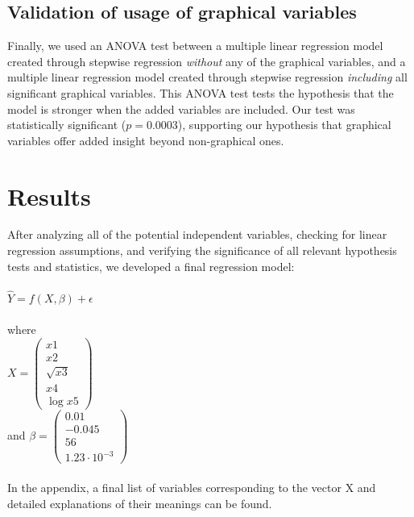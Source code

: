 \documentclass[oneside,12pt]{report}
\begin{document}
\section*{Validation of usage of graphical variables}

Finally, we used an ANOVA test between a multiple linear regression model created through stepwise regression \emph{without} any of the graphical variables, and a multiple linear regression model created through stepwise regression \emph{including} all significant graphical variables. This ANOVA test tests the hypothesis that the model is stronger when the added variables are included. Our test was statistically significant (\begin{math}p=0.0003\end{math}), supporting our hypothesis that graphical variables offer added insight beyond non-graphical ones.

\chapter{Results}

After analyzing all of the potential independent variables, checking for linear regression assumptions, and verifying the significance of all relevant hypothesis tests and statistics, we developed a final regression model:
\\
\\
\begin{math}
\hat{Y} = f(X,\beta) + \epsilon
\end{math}
\\
\\
where
\\
\begin{math} X = 
\begin{pmatrix}
x1 \\ x2 \\ \sqrt{x3} \\ x4 \\ \log{x5}
\end{pmatrix}
\end{math}
\\
and
\begin{math} \beta =
\begin{pmatrix}
0.01 \\ -0.045 \\ 56 \\ 1.23\cdot10^{-3}
\end{pmatrix}
\end{math}
\\ \\
In the appendix, a final list of variables corresponding to the vector X and detailed explanations of their meanings can be found.
\end{document}
